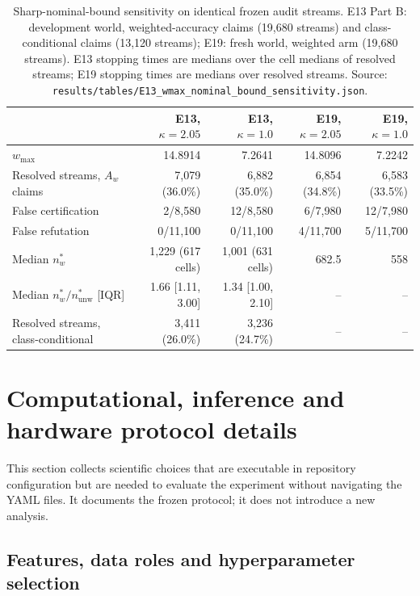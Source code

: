 \documentclass[11pt,a4paper]{article}
\begin{document}
\begin{table}[H]
\centering
\small
\setlength{\tabcolsep}{4pt}
\caption{Sharp-nominal-bound sensitivity on identical frozen audit streams.
E13 Part B: development world, weighted-accuracy claims (19,680 streams) and
class-conditional claims (13,120 streams); E19: fresh world, weighted arm
(19,680 streams). E13 stopping times are medians over the cell medians of
resolved streams; E19 stopping times are medians over resolved streams. Source:
\texttt{results/tables/E13\_wmax\_nominal\_bound\_sensitivity.json}.}
\label{tab:wmax}
\begin{tabular}{lrrrr}
\toprule
 & E13, $\kappa=2.05$ & E13, $\kappa=1.0$ & E19, $\kappa=2.05$ & E19, $\kappa=1.0$ \\
\midrule
$w_{\max}$ & 14.8914 & 7.2641 & 14.8096 & 7.2242 \\
Resolved streams, $A_w$ claims & 7,079 (36.0\%) & 6,882 (35.0\%) & 6,854 (34.8\%) & 6,583 (33.5\%) \\
False certification & 2/8,580 & 12/8,580 & 6/7,980 & 12/7,980 \\
False refutation & 0/11,100 & 0/11,100 & 4/11,700 & 5/11,700 \\
Median $n^*_w$ & 1,229 (617 cells) & 1,001 (631 cells) & 682.5 & 558 \\
Median $n^*_w/n^*_{\mathrm{unw}}$ [IQR] & 1.66 [1.11, 3.00] & 1.34 [1.00, 2.10] & -- & -- \\
Resolved streams, class-conditional & 3,411 (26.0\%) & 3,236 (24.7\%) & -- & -- \\
\bottomrule
\end{tabular}
\end{table}

\FloatBarrier

\section{Computational, inference and hardware protocol details}

\small

This section collects scientific choices that are executable in repository
configuration but are needed to evaluate the experiment without navigating the
YAML files. It documents the frozen protocol; it does not introduce a new
analysis.

\subsection{Features, data roles and hyperparameter selection}
\end{document}
